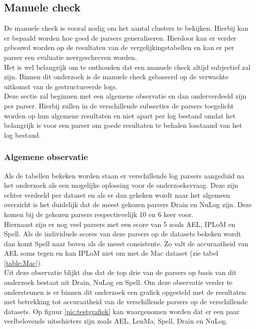 \subsection{Manuele check}
De manuele check is vooral nodig om het aantal clusters te bekijken. Hierbij kan er bepaald worden hoe goed de parsers generaliseren. Hierdoor kan er verder gebouwd worden op de resultaten van de vergelijkingstabellen en kan er per parser een evaluatie neergeschreven worden.\\

Het is wel belangrijk om te onthouden dat een manuele check altijd subjectief zal zijn. Binnen dit onderzoek is de manuele check gebaseerd op de verwachte uitkomst van de gestructureerde logs.\\

Deze sectie zal beginnen met een algemene observatie en dan onderverdeeld zijn per parser. Hierbij zullen in de verschillende subsecties de parsers toegelicht worden op hun algemene resultaten en niet apart per log bestand omdat het belangrijk is voor een parser om goede resultaten te behalen losstaand van het log bestand.

\subsubsection{Algemene observatie}
Als de tabellen bekeken worden staan er verschillende log parsers aangeduid na het onderzoek als een mogelijke oplossing voor de onderzoeksvraag. Deze zijn echter verdeeld per dataset en als er dan gekeken wordt naar het algemeen overzicht is het duidelijk dat de meest gekozen parsers Drain en NuLog zijn. Deze komen bij de gekozen parsers respectievelijk 10 en 6 keer voor.\\

Hiernaast zijn er nog veel parsers met een score van 5 zoals AEL, IPLoM en Spell. Als de individuele scores van deze parsers op de datasets bekeken wordt dan komt Spell naar boven als de meest consistente. Zo valt de accuraatheid van AEL soms tegen en kan IPLoM niet om met de Mac dataset (zie tabel \ref{table:Mac}).\\

Uit deze observatie blijkt dus dat de top drie van de parsers op basis van dit onderzoek bestaat uit Drain, NuLog en Spell. Om deze observatie verder te ondersteunen is er binnen dit onderzoek een grafiek opgesteld met de resultaten met betrekking tot accuraatheid van de verschillende parsers op de verschillende datasets. Op figuur \ref{pic:testgrafiek} kan waargenomen worden dat er een paar veelbelovende uitschieters zijn zoals AEL, LenMa, Spell, Drain en NuLog.

